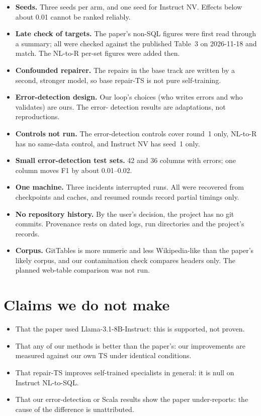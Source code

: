 \begin{itemize}
\item \textbf{Seeds.} Three seeds per arm, and one seed for Instruct NV. Effects below about 0.01 cannot be ranked
reliably.
\item \textbf{Late check of targets.} The paper's non-SQL figures were first read through a summary; all were checked
against the published Table~3 on 2026-11-18 and match. The NL-to-R per-set figures were added then.
\item \textbf{Confounded repairer.} The repairs in the base track are written by a second, stronger model, so base
repair-TS is not pure self-training.
\item \textbf{Error-detection design.} Our loop's choices (who writes errors and who validates) are ours. The error-
detection results are adaptations, not reproductions.
\item \textbf{Controls not run.} The error-detection controls cover round~1 only, NL-to-R has no same-data control,
and Instruct NV has seed~1 only.
\item \textbf{Small error-detection test sets.} 42 and 36 columns with errors; one column moves F1 by about 0.01--0.02.
\item \textbf{One machine.} Three incidents interrupted runs. All were recovered from checkpoints and caches, and
resumed rounds record partial timings only.
\item \textbf{No repository history.} By the user's decision, the project has no git commits. Provenance rests on dated
logs, run directories and the project's records.
\item \textbf{Corpus.} GitTables is more numeric and less Wikipedia-like than the paper's likely corpus, and our
contamination check compares headers only. The planned web-table comparison was not run.
\end{itemize}

\section{Claims we do not make}

\begin{itemize}
\item That the paper used Llama-3.1-8B-Instruct: this is supported, not proven.
\item That any of our methods is better than the paper's: our improvements are measured against our own TS under
identical conditions.
\item That repair-TS improves self-trained specialists in general: it is null on Instruct NL-to-SQL.
\item That our error-detection or Scala results show the paper under-reports: the cause of the difference is
unattributed.
\end{itemize}

